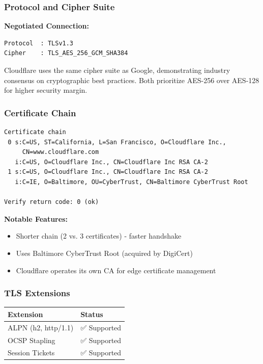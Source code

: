 \documentclass[12pt,a4paper]{article}
\begin{document}
\subsubsection{Protocol and Cipher Suite}

\textbf{Negotiated Connection:}
\begin{lstlisting}[style=outputstyle]
Protocol  : TLSv1.3
Cipher    : TLS_AES_256_GCM_SHA384
\end{lstlisting}

Cloudflare uses the same cipher suite as Google, demonstrating industry consensus on cryptographic best practices. Both prioritize AES-256 over AES-128 for higher security margin.

\subsubsection{Certificate Chain}

\begin{lstlisting}[style=outputstyle]
Certificate chain
 0 s:C=US, ST=California, L=San Francisco, O=Cloudflare Inc.,
     CN=www.cloudflare.com
   i:C=US, O=Cloudflare Inc., CN=Cloudflare Inc RSA CA-2
 1 s:C=US, O=Cloudflare Inc., CN=Cloudflare Inc RSA CA-2
   i:C=IE, O=Baltimore, OU=CyberTrust, CN=Baltimore CyberTrust Root

Verify return code: 0 (ok)
\end{lstlisting}

\textbf{Notable Features:}
\begin{itemize}
    \item Shorter chain (2 vs. 3 certificates) - faster handshake
    \item Uses Baltimore CyberTrust Root (acquired by DigiCert)
    \item Cloudflare operates its own CA for edge certificate management
\end{itemize}

\subsubsection{TLS Extensions}

\begin{table}[H]
\centering
\begin{tabular}{@{}ll@{}}
\toprule
\textbf{Extension} & \textbf{Status} \\ \midrule
ALPN (h2, http/1.1) & ✅ Supported \\
OCSP Stapling & ✅ Supported \\
Session Tickets & ✅ Supported \\
\bottomrule
\end{tabular}
\end{table}
\end{document}
